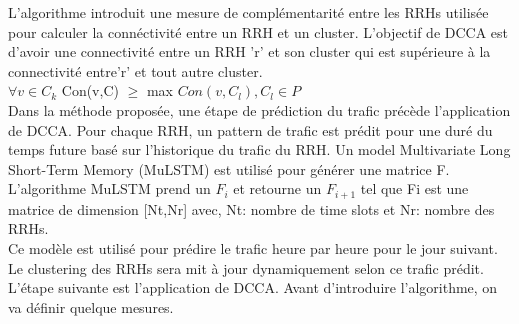 \documentclass{report}
\begin{document}
L'algorithme introduit une mesure de complémentarité entre les RRHs utilisée pour calculer la connéctivité entre un RRH et un cluster.
L'objectif de DCCA est d'avoir une connectivité entre un RRH 'r' et son cluster qui est supérieure à la connectivité entre'r' et tout autre cluster.\\
$\forall v\in C_{k}$  Con(v,C) $\ge$ max $Con(v,C_{l}),C_{l} \in P$ \\
Dans la méthode proposée, une étape de prédiction du trafic précède l'application de DCCA. Pour chaque RRH, un pattern de trafic 
est prédit pour une duré du temps future basé sur l'historique du trafic du RRH. Un model Multivariate Long Short-Term Memory (MuLSTM) est utilisé 
pour générer une matrice F. L'algorithme MuLSTM prend un $F_{i}$ et retourne un $F_{i+1}$ tel que Fi est une matrice de dimension [Nt,Nr] avec, Nt: nombre de time slots et Nr: nombre des RRHs.\\
Ce modèle est utilisé pour prédire le trafic heure par heure pour le jour suivant. Le clustering des RRHs sera mit à jour dynamiquement selon ce trafic prédit. \\
L'étape suivante est l'application de DCCA. Avant d'introduire l'algorithme, on va définir quelque mesures.\\
\end{document}
